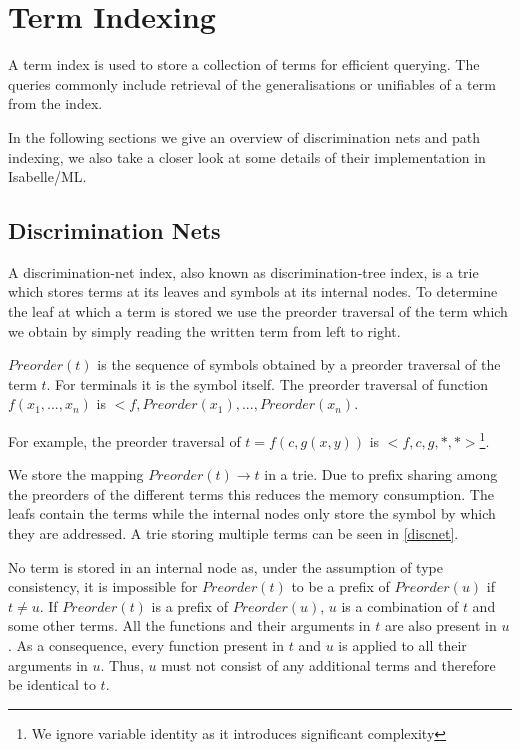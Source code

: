 \chapter{Term Indexing}
A term index is used to store a collection of terms for efficient querying. The queries commonly include retrieval of the generalisations or unifiables of a term from the index. 

In the following sections we give an overview of discrimination nets and path indexing, we also take a closer look at some details of their implementation in Isabelle/ML.

\section{Discrimination Nets}
A discrimination-net index, also known as discrimination-tree index, is a trie which stores terms at its leaves and symbols at its internal nodes. To determine the leaf at which a term is stored we use the preorder traversal of the term which we obtain by simply reading the written term from left to right.

\begin{defn}
  $Preorder(t)$ is the sequence of symbols obtained by a preorder traversal of the term $t$. For terminals it is the symbol itself. The preorder traversal of function $f(x_{1},...,x_{n})$ is $<f,Preorder(x_{1}),...,Preorder(x_{n})$.
\end{defn}
For example, the preorder traversal of $t = f(c,g(x,y))$ is $<f,c,g,*,*>$\footnote{We ignore variable identity as it introduces significant complexity}.

We store the mapping $Preorder(t) \rightarrow t$ in a trie. Due to prefix sharing among the preorders of the different terms this reduces the memory consumption. The leafs contain the terms while the internal nodes only store the symbol by which they are addressed. A trie storing multiple terms can be seen in \ref{discnet}.

No term is stored in an internal node as, under the assumption of type consistency, it is impossible for $Preorder(t)$ to be a prefix of $Preorder(u)$ if $t \neq u$. If $Preorder(t)$ is a prefix of $Preorder(u)$, $u$ is a combination of $t$ and some other terms. All the functions and their arguments in $t$ are also present in $u$. As a consequence, every function present in $t$ and $u$ is applied to all their arguments in $u$. Thus, $u$ must not consist of any additional terms and therefore be identical to $t$.

